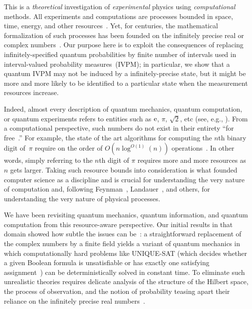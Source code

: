 \documentclass[12pt]{iopart}
\theoremstyle{plain}
\theoremstyle{definition}
\begin{document}
This is a \emph{theoretical} investigation of \emph{experimental}
physics using \emph{computational} methods. All experiments and computations
are processes bounded in space, time, energy, and other resources~\cite{Jaeger2007,Piccinini2015}.
Yet, for centuries, the mathematical formalization of such processes
has been founded on the infinitely precise real or complex numbers~\cite{Ziegler2007,weihrauch2012computable,blum2012complexity}.
Our purpose here is to exploit the consequences of replacing infinitely-specified
quantum probabilities by finite number of intervals used in interval-valued
probability measures~(IVPM); in particular, we show that a quantum
IVPM may not be induced by a infinitely-precise state, but it might
be more and more likely to be identified to a particular state when
the measurement resources increase.

Indeed, almost every description of quantum mechanics, quantum computation,
or quantum experiments refers to entities such as $\mathrm{e}$, $\pi$,
$\sqrt{2}$, etc (see, e.g., \cite{Redhead1987-REDINA,544199,Mermin2007}).
From a computational perspective, such numbers do not exist in their
entirety ``for free~\cite{Kent1999,CliftonKent2000}.'' For example,
the state of the art algorithms for computing the $n$th binary digit
of~$\pi$ require on the order of $O\left(n\log^{O\left(1\right)}\left(n\right)\right)$
operations~\cite{journals/moc/BaileyBP97}. In other words, simply
referring to the $n$th digit of $\pi$ requires more and more resources
as $n$ gets larger. Taking such resource bounds into consideration
is what founded computer science as a discipline and is crucial for
understanding the very nature of computation and, following Feynman~\cite{Feynman1982Simulating},
Landauer~\cite{Landauer1996188}, and others, for understanding the
very nature of physical processes.

We have been revisiting quantum mechanics, quantum information, and
quantum computation from this resource-aware perspective. Our initial
results in that domain showed how subtle the issues can be~\cite{usat,geometry2013,DQT2014}:
a straightforward replacement of the complex numbers by a finite field
yields a variant of quantum mechanics in which computationally hard
problems like UNIQUE-SAT (which decides whether a given Boolean formula
is unsatisfiable or has exactly one satisfying assignment~\cite{Valiant198685,Papadimitriou1993,AroraBarak2009})
can be deterministically solved in constant time. To eliminate such
unrealistic theories requires delicate analysis of the structure of
the Hilbert space, the process of observation, and the notion of probability
teasing apart their reliance on the infinitely precise real numbers~\cite{geometry2013,DQT2014}. 
\end{document}
